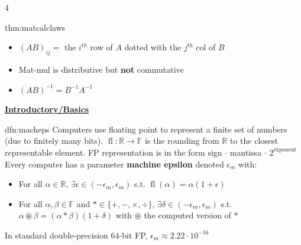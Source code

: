 \documentclass[landscape, 8pt]{extarticle}
\DeclareMathOperator{\fl}{fl}
\begin{document}
\begin{multicols*}{4}
		\begin{thm}{thm:matcalclaws}{ }
			\begin{itemize}
				\item $(AB)_{ij} =$ the $i^{th}$ row of $A$ dotted with the $j^{th}$ col of $B$
				\item Mat-mul is distributive but \textbf{not} commutative
			\end{itemize}
			{
			\begin{itemize}
				\item $(AB)^{-1} = B^{-1}A^{-1}$ 
			\end{itemize}
			}
				
			
		\end{thm}
		
		
		
		
		

{\footnotesize \textbf{\underline{Introductory/Basics}}}
		
		
		
		\begin{dfn}{dfn:macheps}{ }
			Computers use floating point to represent a finite set of numbers (due to finitely many bits). $\fl : \mathbb{R} \to \mathbb{F}$ is the rounding from $\mathbb{R}$ to the closest representable element. FP representation is in the form sign $\cdot$ mantissa $\cdot$  $2^{\text{exponent}}$\\
			Every computer has a parameter \textbf{machine epsilon} denoted $\epsilon_m$ with:
			\begin{itemize}
				\item For all $\alpha\in \mathbb{R}$, $\exists\epsilon\in (-\epsilon_m,\epsilon_m)$ s.t. $\fl(\alpha) = \alpha(1+\epsilon)$
				\item For all $\alpha, \beta\in \mathbb{F}$ and $\ast \in \{+, -, \times, \div\}$, $\exists \delta\in (-\epsilon_m,\epsilon_m)$ s.t. $\alpha \circledast \beta = (\alpha \ast \beta)(1+\delta)$ with $\circledast$ the computed version of $\ast$
			\end{itemize}
			In standard double-precision $64$-bit FP, $\epsilon_m \approx 2.22 \cdot 10^{-16}$
			

\end{dfn}
\end{multicols*}
\end{document}
